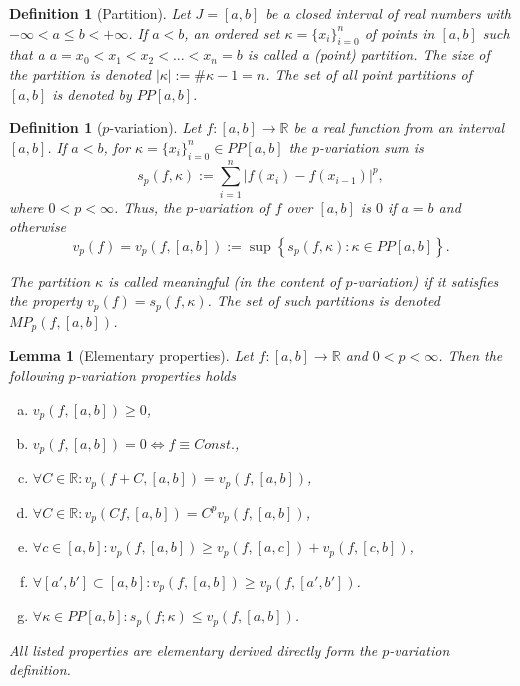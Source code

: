 \documentclass[12pt, a4paper]{article}
\newtheorem{lemma}[theorem]{Lemma}
\newtheorem{definition}[theorem]{Definition}
\numberwithin{equation}{section}
\begin{document}
  
\begin{definition}[Partition]\label{def:pp}
  Let $J = [a,b]$ be a closed interval of real numbers with $-\infty < a \leq b <+\infty$. 
  If $a < b$, an ordered set $\kappa = \{x_{i}\}_{i=0}^{n}$ of points in $[a,b]$ such that a  
  $a=x_{0}<x_{1}<x_{2}<...<x_{n}=b$ is called a \emph{(point) partition}. 
  The size of the partition is denoted $\left|\kappa \right| :=\#\kappa-1=n$. 
  The set of all point partitions of $[a,b]$ is denoted by $PP[a,b]$.  
\end{definition} 
 
\begin{definition}[$p$-variation]\label{def:pvar}
  Let $f:[a,b] \rightarrow \mathbb{R}$ be a real function from an interval $[a,b]$.
  If $a<b$, for  $\kappa =\{x_{i}\}_{i=0}^{n} \in PP[a,b]$ the \emph{$p$-variation sum} is 
  \begin{equation}\label{eq:def_pvarsum}
    s_{p}(f,\kappa):=\sum_{i=1}^{n}| f( x_{i}) -f( x_{i-1})|^{p},
  \end{equation}
  where $0<p<\infty $. Thus, the \emph{$p$-variation} of $f$ over $[a,b]$ is $0$ if $a = b$ and otherwise
  \begin{equation}\label{eq:def_pvar}
    v_{p}(f) =v_{p}(f,[a,b]) :=\sup \left\{
    s_{p}(f,\kappa ):\kappa \in PP[a,b]\right\}.    
  \end{equation}
  
  The partition $\kappa$ is called \emph{meaningful} (in the content of $p$-variation) 
  if it satisfies the property $v_{p}(f) = s_{p}(f,\kappa)$.
  The set of such partitions is denoted
  $MP_{p}(f,[a,b])$.
\end{definition}  
 
\begin{lemma}[Elementary properties]\label{lm:element_properties} 
  Let $f:[a,b] \rightarrow \mathbb{R}$ and $0<p<\infty $. 
  Then the following $p$-variation properties holds
  \begin{enumerate}[a)]
    \item \label{lm:ep_a} $ v_p(f,[a,b]) \geq 0 $,
    \item \label{lm:ep_b} $ v_p(f,[a,b]) = 0 \Leftrightarrow f \equiv Const. $,
    \item \label{lm:ep_c} $ \forall C \in \mathbb{R}: v_p(f+C,[a,b]) = v_p(f,[a,b]) $,  
    \item \label{lm:ep_d} $ \forall C \in \mathbb{R}: v_p(Cf,[a,b]) = C^p v_p(f,[a,b]) $,  
    \item \label{lm:ep_e} $ \forall c \in [a,b]: v_p(f,[a,b]) \geq v_p(f,[a,c]) + v_p(f,[c,b]) $,  
    \item \label{lm:ep_f} $ \forall [a',b'] \subset [a,b] : v_p(f,[a,b]) \geq v_p(f,[a',b']) $.  
    \item \label{lm:ep_g} $ \forall \kappa \in PP[a,b]:s_{p}(f;\kappa) \leq v_p(f,[a,b]) $.  
  \end{enumerate}

  All listed properties are elementary derived directly form the $p$-variation definition.
\end{lemma}
 
\end{document}
